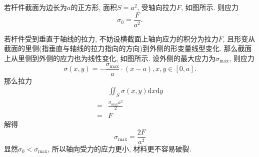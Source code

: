 \documentclass{article}
\begin{document}
\fangsong 若杆件截面为边长为$a$的正方形, 面积$S=a^2$, 受轴向拉力$F$, 如图所示. 则应力
\[\sigma_0=\frac{F}{a^2}.\]
\par 若杆件受到垂直于轴线的拉力, 不妨设横截面上轴向应力的积分为拉力$F$, 且形变从截面的里侧(指垂直与轴线的拉力指向的方向)到外侧的形变量线型变化. 那么截面上从里侧到外侧的应力也为线性变化, 如图所示.
设外侧的最大应力为$\sigma_{\mathrm{max}}$, 则应力
\[\sigma(x,y)=-\frac{\sigma_{\mathrm{max}}}{a}\cdot(x-a), x,y\in[0,a].\]
那么拉力
\begin{align*}
&\iint_{S}\sigma(x,y)\mathrm{d}x\mathrm{d}y\\
=&\frac{\sigma_{\mathrm{max}}a^2}{2}\\
=&F
\end{align*}
解得
\[\sigma_{\mathrm{max}}=\frac{2F}{a^2}\]
显然$\sigma_0<\sigma_{\mathrm{max}}$, 所以轴向受力的应力更小, 材料更不容易破裂.
\end{document}
